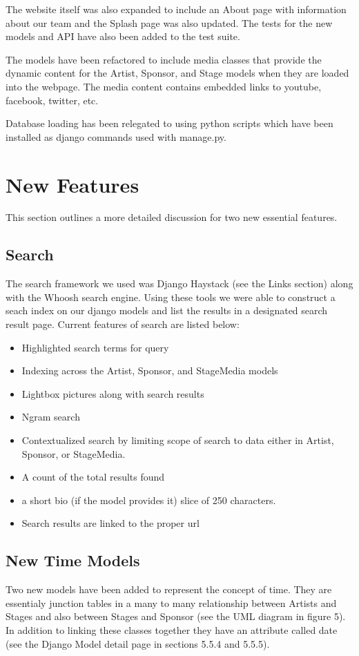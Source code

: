 \documentclass[12pt,english]{scrartcl}
\begin{document}
The website itself was also expanded to include an About page with information about our team and the Splash page was also updated.
The tests for the new models and API have also been added to the test suite.

The models have been refactored to include media classes that provide the dynamic content for the Artist,
Sponsor, and Stage models when they are loaded into the webpage. The media content contains embedded links to youtube, facebook, twitter, etc. 

Database loading has been relegated to using python scripts which have been installed as django commands used with manage.py. 

\section{New Features}
This section outlines a more detailed  discussion for two new essential features.

\subsection{Search}
The search framework we used was Django Haystack (see the Links section) along with the Whoosh search engine. Using these tools we were able
to construct a seach index on our django models and list the results in a designated search result page. Current features of search are listed below:
\begin{itemize}
 \item Highlighted search terms for query
 \item Indexing across the Artist, Sponsor, and StageMedia models
 \item Lightbox pictures along with search results
 \item Ngram search
 \item Contextualized search by limiting scope of search to data either in Artist, Sponsor, or StageMedia.
 \item A count of the total results found
 \item a short bio (if the model provides it) slice of 250 characters.
 \item Search results are linked to the proper url
\end{itemize}

\subsection{New Time Models}
Two new models have been added to represent the concept of time. They are essentialy junction tables in a many to many relationship between Artists and Stages and also between Stages and Sponsor
(see the UML diagram in figure 5). In addition to linking these classes together they have an attribute called date (see the Django Model detail page in sections 5.5.4 and 5.5.5).
\end{document}
